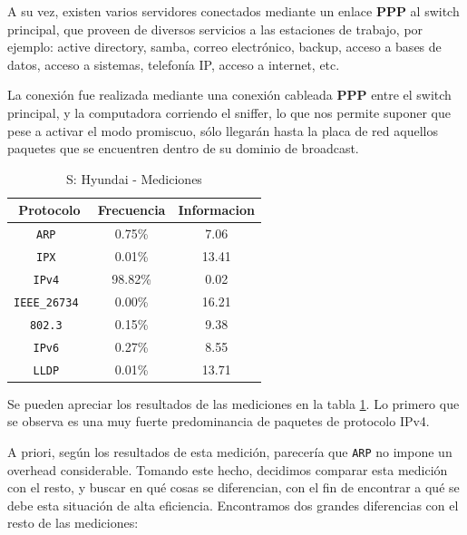 \documentclass[final,inline,a4paper,narroweqnarray]{ieee}
\begin{document}
    A su vez, existen varios servidores conectados mediante un enlace
    \textbf{PPP} al switch principal, que proveen de diversos servicios a las
    estaciones de trabajo, por ejemplo: active directory, samba,
    correo electrónico, backup, acceso a bases de datos, acceso a
    sistemas, telefonía IP, acceso a internet, etc.

    La conexión fue realizada mediante una conexión cableada
    \textbf{PPP} entre el switch principal, y la computadora corriendo
    el sniffer, lo que nos permite suponer que pese a activar el modo
    promiscuo, sólo llegarán hasta la placa de red aquellos paquetes
    que se encuentren dentro de su dominio de broadcast.

    \begin{table}\begin{center}
      \begin{tabular}{|c|c|c|}
      \hline
      \textbf{Protocolo}   & \textbf{Frecuencia} & \textbf{Informacion}\\ \hline
      \texttt{ARP         }& 0.75\%     & 7.06       \\ \hline
      \texttt{IPX         }& 0.01\%     & 13.41      \\ \hline
      \texttt{IPv4        }& 98.82\%    & 0.02       \\ \hline
      \texttt{IEEE\_26734 }& 0.00\%     & 16.21      \\ \hline
      \texttt{802.3       }& 0.15\%     & 9.38       \\ \hline
      \texttt{IPv6        }& 0.27\%     & 8.55       \\ \hline
      \texttt{LLDP        }& 0.01\%     & 13.71      \\ \hline
      \end{tabular}
      \caption{S: Hyundai - Mediciones}
      \label{hyundai-s-table}
    \end{center}\end{table}

    Se pueden apreciar los resultados de las mediciones en la tabla
    \ref{hyundai-s-table}. Lo primero que se observa es una muy fuerte
    predominancia de paquetes de protocolo IPv4.

    A priori, según los resultados de esta medición, parecería que
    \texttt{ARP} no impone un overhead considerable. Tomando este
    hecho, decidimos comparar esta medición con el resto, y buscar en
    qué cosas se diferencian, con el fin de encontrar a qué se debe
    esta situación de alta eficiencia. Encontramos dos grandes
    diferencias con el resto de las mediciones:
\end{document}
